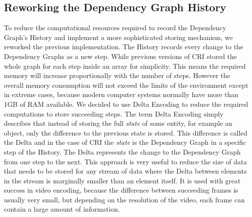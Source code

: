 \subsection{Reworking the Dependency Graph History}
To reduce the computational resources required to record the Dependency Graph's History and implement a more sophisticated storing mechanism, we reworked the previous implementation. The History records every change to the Dependency Graphs as a new step. While previous versions of CRI stored the whole graph for each step inside an array for simplicity. This means the required memory will increase proportionally with the number of steps. However the overall memory consumption will not exceed the limits of the environment except in extreme cases, because modern computer systems normally have more than 1GB of RAM available. We decided to use Delta Encoding to reduce the required computations to store succeeding steps. The term Delta Encoding simply describes that instead of storing the full \emph{state} of some entity, for example an object, only the difference to the previous state is stored. This difference is called the Delta and in the case of CRI the \emph{state} is the Dependency Graph in a specific step of the History. The Delta represents the change to the Dependency Graph from one step to the next. This approach is very useful to reduce the size of data that needs to be stored for any stream of data where the Delta between elements in the stream is marginally smaller than an element itself. It is used with great success in video encoding, because the difference between succeeding frames is usually very small, but depending on the resolution of the video, each frame can contain a large amount of information.
